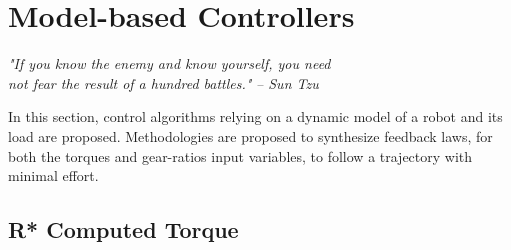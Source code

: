 

\newpage

\section{Model-based Controllers}
\label{sec:HierachicalControlApproach}


\begin{flushright}
\textit{"If you know the enemy and know yourself, you need \\ not fear the result of a hundred battles."}  \emph{-- Sun Tzu}
\end{flushright}
\vspace{+10pt}


In this section, control algorithms relying on a dynamic model of a robot and its load are proposed. Methodologies are proposed to synthesize feedback laws, for both the torques and gear-ratios input variables, to follow a trajectory with minimal effort. 


\subsection{R* Computed Torque}
\label{sec:RobustTrajectoryFollowingController}


